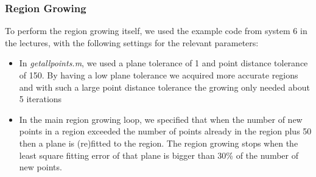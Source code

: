 \subsubsection{Region Growing}

To perform the region growing itself, we used the example code from system 6 in the lectures, with the following settings for the relevant parameters:

\begin{itemize}
	\item In \emph{getallpoints.m}, we used a plane tolerance of 1 and point distance tolerance of 150. By having a low plane tolerance we acquired more accurate regions and with such a large point distance tolerance the growing only needed about 5 iterations
	\item In the main region growing loop, we specified that when the number of new points in a region exceeded the number of points already in the region plus 50 then a plane is (re)fitted to the region. The region growing stops when the least square fitting error of that plane is bigger than 30\% of the number of new points.
\end{itemize}
